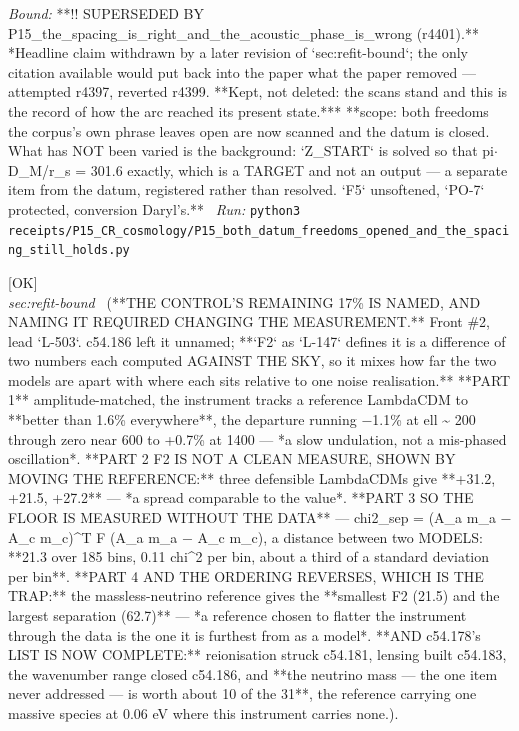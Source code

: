 \begin{description}
 \emph{Bound:} **!! SUPERSEDED BY P15\_the\_spacing\_is\_right\_and\_the\_acoustic\_phase\_is\_wrong (r4401).** *Headline claim withdrawn by a later revision of `sec:refit-bound`; the only citation available would put back into the paper what the paper removed --- attempted r4397, reverted r4399. **Kept, not deleted: the scans stand and this is the record of how the arc reached its present state.*** **scope: both freedoms the corpus's own phrase leaves open are now scanned and the datum is closed. What has NOT been varied is the background: `Z\_START` is solved so that pi\ensuremath{\cdot}D\_M/r\_s = 301.6 exactly, which is a TARGET and not an output --- a separate item from the datum, registered rather than resolved. `F5` unsoftened, `PO-7` protected, conversion Daryl's.**
\ \emph{Run:} \texttt{python3 receipts/P15\_CR\_cosmology/P15\_both\_datum\_freedoms\_opened\_and\_the\_spacing\_still\_holds.py}
\item[\rcptlabel{P15_the_floor_is_a_distance_between_models_not_a_number_from_the_data}{P15R93}\textbf{P15R93}\quad\texttt{P15\_the\_floor\_is\_a\_distance\_between\_models\_not\_a\_number\_from\_the\_data}]\hfill\textsf{[OK]}\\
\textit{sec:refit-bound} \ (**THE CONTROL'S REMAINING 17\% IS NAMED, AND NAMING IT REQUIRED CHANGING THE MEASUREMENT.** Front \#2, lead `L-503`. c54.186 left it unnamed; **`F2` as `L-147` defines it is a difference of two numbers each computed AGAINST THE SKY, so it mixes how far the two models are apart with where each sits relative to one noise realisation.** **PART 1** amplitude-matched, the instrument tracks a reference LambdaCDM to **better than 1.6\% everywhere**, the departure running \ensuremath{-}1.1\% at ell \textasciitilde{} 200 through zero near 600 to +0.7\% at 1400 --- *a slow undulation, not a mis-phased oscillation*. **PART 2 F2 IS NOT A CLEAN MEASURE, SHOWN BY MOVING THE REFERENCE:** three defensible LambdaCDMs give **+31.2, +21.5, +27.2** --- *a spread comparable to the value*. **PART 3 SO THE FLOOR IS MEASURED WITHOUT THE DATA** --- chi2\_sep = (A\_a m\_a \ensuremath{-} A\_c m\_c)\textasciicircum{}T F (A\_a m\_a \ensuremath{-} A\_c m\_c), a distance between two MODELS: **21.3 over 185 bins, 0.11 chi\textasciicircum{}2 per bin, about a third of a standard deviation per bin**. **PART 4 AND THE ORDERING REVERSES, WHICH IS THE TRAP:** the massless-neutrino reference gives the **smallest F2 (21.5) and the largest separation (62.7)** --- *a reference chosen to flatter the instrument through the data is the one it is furthest from as a model*.  **AND c54.178's LIST IS NOW COMPLETE:** reionisation struck c54.181, lensing built c54.183, the wavenumber range closed c54.186, and **the neutrino mass --- the one item never addressed --- is worth about 10 of the 31**, the reference carrying one massive species at 0.06 eV where this instrument carries none.). 

\end{description}
